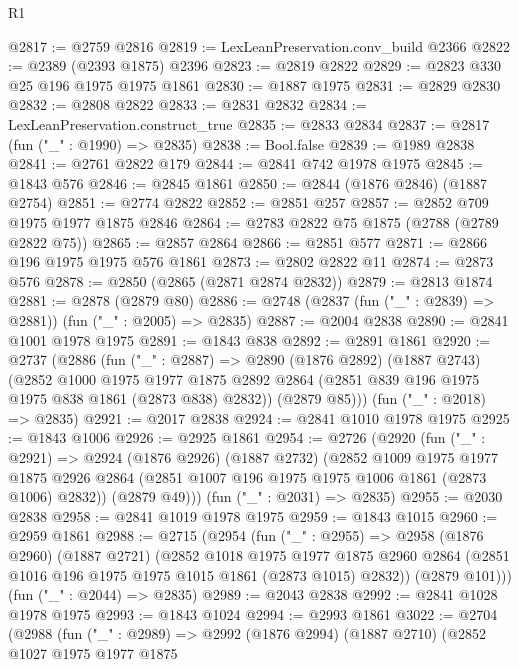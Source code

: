 \begin{lexlean}{R1}
\begin{coremodule}
@2817 := @2759 @2816
@2819 := LexLeanPreservation.conv_build @2366
@2822 := @2389 (@2393 @1875) @2396
@2823 := @2819 @2822
@2829 := @2823 @330 @25 @196 @1975 @1975 @1861
@2830 := @1887 @1975
@2831 := @2829 @2830
@2832 := @2808 @2822
@2833 := @2831 @2832
@2834 := LexLeanPreservation.construct_true
@2835 := @2833 @2834
@2837 := @2817 (fun ("_" : @1990) => @2835)
@2838 := Bool.false
@2839 := @1989 @2838
@2841 := @2761 @2822 @179
@2844 := @2841 @742 @1978 @1975
@2845 := @1843 @576
@2846 := @2845 @1861
@2850 := @2844 (@1876 @2846) (@1887 @2754)
@2851 := @2774 @2822
@2852 := @2851 @257
@2857 := @2852 @709 @1975 @1977 @1875 @2846
@2864 := @2783 @2822 @75 @1875 (@2788 (@2789 @2822 @75))
@2865 := @2857 @2864
@2866 := @2851 @577
@2871 := @2866 @196 @1975 @1975 @576 @1861
@2873 := @2802 @2822 @11
@2874 := @2873 @576
@2878 := @2850 (@2865 (@2871 @2874 @2832))
@2879 := @2813 @1874
@2881 := @2878 (@2879 @80)
@2886 := @2748 (@2837 (fun ("_" : @2839) => @2881)) (fun ("_" : @2005) => @2835)
@2887 := @2004 @2838
@2890 := @2841 @1001 @1978 @1975
@2891 := @1843 @838
@2892 := @2891 @1861
@2920 := @2737
    (@2886
      (fun ("_" : @2887) =>
      @2890
        (@1876 @2892)
        (@1887 @2743)
        (@2852
          @1000
          @1975
          @1977
          @1875
          @2892
          @2864
          (@2851 @839 @196 @1975 @1975 @838 @1861 (@2873 @838) @2832))
        (@2879 @85)))
    (fun ("_" : @2018) => @2835)
@2921 := @2017 @2838
@2924 := @2841 @1010 @1978 @1975
@2925 := @1843 @1006
@2926 := @2925 @1861
@2954 := @2726
    (@2920
      (fun ("_" : @2921) =>
      @2924
        (@1876 @2926)
        (@1887 @2732)
        (@2852
          @1009
          @1975
          @1977
          @1875
          @2926
          @2864
          (@2851 @1007 @196 @1975 @1975 @1006 @1861 (@2873 @1006) @2832))
        (@2879 @49)))
    (fun ("_" : @2031) => @2835)
@2955 := @2030 @2838
@2958 := @2841 @1019 @1978 @1975
@2959 := @1843 @1015
@2960 := @2959 @1861
@2988 := @2715
    (@2954
      (fun ("_" : @2955) =>
      @2958
        (@1876 @2960)
        (@1887 @2721)
        (@2852
          @1018
          @1975
          @1977
          @1875
          @2960
          @2864
          (@2851 @1016 @196 @1975 @1975 @1015 @1861 (@2873 @1015) @2832))
        (@2879 @101)))
    (fun ("_" : @2044) => @2835)
@2989 := @2043 @2838
@2992 := @2841 @1028 @1978 @1975
@2993 := @1843 @1024
@2994 := @2993 @1861
@3022 := @2704
    (@2988
      (fun ("_" : @2989) =>
      @2992
        (@1876 @2994)
        (@1887 @2710)
        (@2852
          @1027
          @1975
          @1977
          @1875

\end{coremodule}
\end{lexlean}
